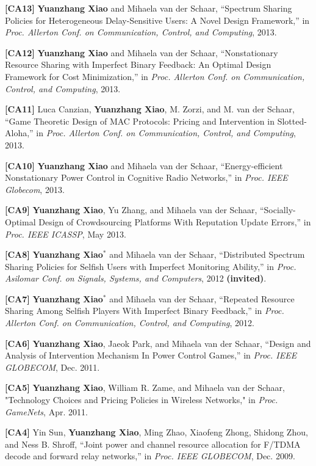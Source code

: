 \documentclass[margin,line]{res}
\begin{document}
\begin{resume}
\textbf{[CA13]} {\bf Yuanzhang Xiao} and Mihaela van der Schaar, ``Spectrum Sharing Policies for Heterogeneous Delay-Sensitive Users: A Novel Design
Framework,'' in \emph{Proc. Allerton Conf. on Communication, Control, and Computing}, 2013.

\textbf{[CA12]} {\bf Yuanzhang Xiao} and Mihaela van der Schaar, ``Nonstationary Resource Sharing with Imperfect Binary Feedback: An Optimal Design
Framework for Cost Minimization,'' in \emph{Proc. Allerton Conf. on Communication, Control, and Computing}, 2013.

\textbf{[CA11]} Luca Canzian, {\bf Yuanzhang Xiao}, M. Zorzi, and M. van der Schaar, ``Game Theoretic Design of MAC Protocols: Pricing and
Intervention in Slotted-Aloha,'' in \emph{Proc. Allerton Conf. on Communication, Control, and Computing}, 2013.

\textbf{[CA10]} {\bf Yuanzhang Xiao} and Mihaela van der Schaar, ``Energy-efficient Nonstationary Power Control in Cognitive Radio Networks,'' in
\emph{Proc. IEEE Globecom}, 2013.

\textbf{[CA9]} {\bf Yuanzhang Xiao}, Yu Zhang, and Mihaela van der Schaar, ``Socially-Optimal Design of Crowdsourcing Platforms With Reputation
Update Errors,'' in \emph{Proc. IEEE ICASSP}, May 2013.

\textbf{[CA8]} {\bf Yuanzhang Xiao}$^*$ and Mihaela van der Schaar, ``Distributed Spectrum Sharing Policies for Selfish Users with Imperfect
Monitoring Ability,'' in \emph{Proc. Asilomar Conf. on Signals, Systems, and Computers}, 2012 {\bf (invited)}.

\textbf{[CA7]} {\bf Yuanzhang Xiao}$^*$ and Mihaela van der Schaar, ``Repeated Resource Sharing Among Selfish Players With Imperfect Binary
Feedback,'' in \emph{Proc. Allerton Conf. on Communication, Control, and Computing}, 2012.

\textbf{[CA6]} {\bf Yuanzhang Xiao}, Jaeok Park, and Mihaela van der Schaar, ``Design and Analysis of Intervention Mechanism In Power Control
Games,'' in \emph{Proc. IEEE GLOBECOM}, Dec. 2011.

\textbf{[CA5]} {\bf Yuanzhang Xiao}, William R. Zame, and Mihaela van der Schaar, "Technology Choices and Pricing Policies in Wireless Networks," in
\emph{Proc. GameNets}, Apr. 2011.

\textbf{[CA4]} Yin Sun, {\bf Yuanzhang Xiao}, Ming Zhao, Xiaofeng Zhong, Shidong Zhou, and Ness B. Shroff, ``Joint power and channel resource
allocation for F/TDMA decode and forward relay networks,'' in \emph{Proc. IEEE GLOBECOM}, Dec. 2009.


\end{resume}
\end{document}
